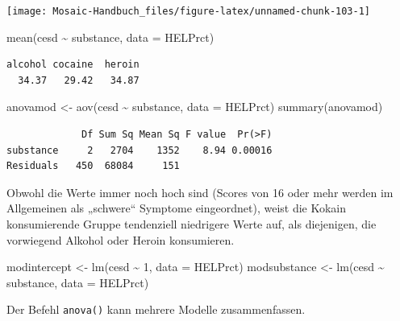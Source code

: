 \documentclass[
  ngerman,
]{scrbook}
\newenvironment{Shaded}{\begin{snugshade}}{\end{snugshade}}
\newcommand{\AttributeTok}[1]{\textcolor[rgb]{0.77,0.63,0.00}{#1}}
\newcommand{\DecValTok}[1]{\textcolor[rgb]{0.00,0.00,0.81}{#1}}
\newcommand{\FunctionTok}[1]{\textcolor[rgb]{0.00,0.00,0.00}{#1}}
\newcommand{\NormalTok}[1]{#1}
\newcommand{\OtherTok}[1]{\textcolor[rgb]{0.56,0.35,0.01}{#1}}
\newcommand{\SpecialCharTok}[1]{\textcolor[rgb]{0.00,0.00,0.00}{#1}}
\begin{document}
\begin{center}\texttt{[image: Mosaic-Handbuch\_files/figure-latex/unnamed-chunk-103-1]} \end{center}

\begin{Shaded}
\begin{Highlighting}[]
\FunctionTok{mean}\NormalTok{(cesd }\SpecialCharTok{\textasciitilde{}}\NormalTok{ substance, }\AttributeTok{data =}\NormalTok{ HELPrct)}
\end{Highlighting}
\end{Shaded}

\begin{verbatim}
alcohol cocaine  heroin 
  34.37   29.42   34.87 
\end{verbatim}

\begin{Shaded}
\begin{Highlighting}[]
\NormalTok{anovamod }\OtherTok{\textless{}{-}} \FunctionTok{aov}\NormalTok{(cesd }\SpecialCharTok{\textasciitilde{}}\NormalTok{ substance, }\AttributeTok{data =}\NormalTok{ HELPrct)}
\FunctionTok{summary}\NormalTok{(anovamod)}
\end{Highlighting}
\end{Shaded}

\begin{verbatim}
             Df Sum Sq Mean Sq F value  Pr(>F)
substance     2   2704    1352    8.94 0.00016
Residuals   450  68084     151                
\end{verbatim}

Obwohl die Werte immer noch hoch sind (Scores von 16 oder mehr werden im Allgemeinen als „schwere`` Symptome eingeordnet), weist die Kokain konsumierende Gruppe tendenziell niedrigere Werte auf, als diejenigen, die vorwiegend Alkohol oder Heroin konsumieren.

\begin{Shaded}
\begin{Highlighting}[]
\NormalTok{modintercept }\OtherTok{\textless{}{-}} \FunctionTok{lm}\NormalTok{(cesd }\SpecialCharTok{\textasciitilde{}} \DecValTok{1}\NormalTok{,         }\AttributeTok{data =}\NormalTok{ HELPrct)}
\NormalTok{modsubstance }\OtherTok{\textless{}{-}} \FunctionTok{lm}\NormalTok{(cesd }\SpecialCharTok{\textasciitilde{}}\NormalTok{ substance, }\AttributeTok{data =}\NormalTok{ HELPrct)}
\end{Highlighting}
\end{Shaded}

Der Befehl \texttt{anova()} kann mehrere Modelle zusammenfassen.
\end{document}
